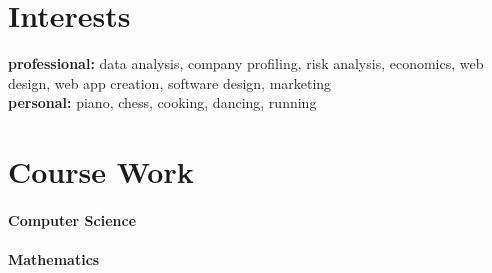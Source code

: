 \documentclass[]{friggeri-cv} %
\begin{document}
\section{Interests}

\textbf{professional:} data analysis, company profiling, risk analysis, economics, web design,
web app creation, software design, marketing \\
\textbf{personal:} piano, chess, cooking, dancing, running


\section{Course Work}

\paragraph{Computer Science}
\paragraph{Mathematics}

\end{document}
